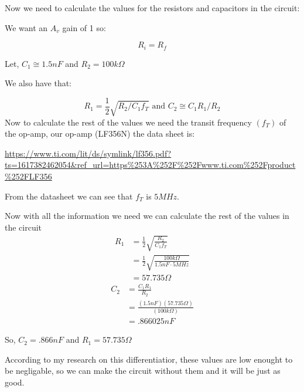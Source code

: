 \documentclass{article}
\begin{document}
Now we need to calculate the values for the resistors and capacitors in the circuit:
\begin{center}
    We want an $A_v$ gain of 1 so:
\end{center}
\begin{equation}
    R_i = R_f
\end{equation}
\begin{center}
    Let, $\boxed{C_1 \cong 1.5n F}$ and $\boxed{R_2 = 100k\Omega}$
\end{center}
\begin{center}
    We also have that:
\end{center}
\begin{equation}
    R_1 = \frac{1}{2}\sqrt{R_2/C_1f_T}\text{ and }C_2 \cong C_1R_1/R_2
\end{equation}
Now to calculate the rest of the values we need the transit frequency $(f_T)$ of the op-amp, our op-amp (LF356N) the data sheet is:

\url{https://www.ti.com/lit/ds/symlink/lf356.pdf?ts=1617382462054&ref_url=https%253A%252F%252Fwww.ti.com%252Fproduct%252FLF356}

\begin{center}
\end{center}
From the datasheet we can see that  $f_T$ is $5MHz$.

Now with all the information we need we can calculate the rest of the values in the circuit
\begin{align}
    R_1 &= \frac{1}{2}\sqrt{\frac{R_2}{C_1f_T}} \\
    &= \frac{1}{2}\sqrt{\frac{100k\Omega}{1.5n F\cdot 5MHz}}\\
    &= 57.735\Omega
\end{align}
\begin{align}
    C_2 &= \frac{C_1R_1}{R_2}\\ 
    &= \frac{(1.5nF)(57.735\Omega)}{(100k\Omega)}\\ 
    &= .866025nF
\end{align}
\begin{center}
    So, $\boxed{C_2 = .866nF}$ and $\boxed{R_1 = 57.735\Omega}$
\end{center} 
According to my research on this differentiatior, these values are low enought to be negligable, so we can make the circuit without them and it will be  just as good.
\end{document}
